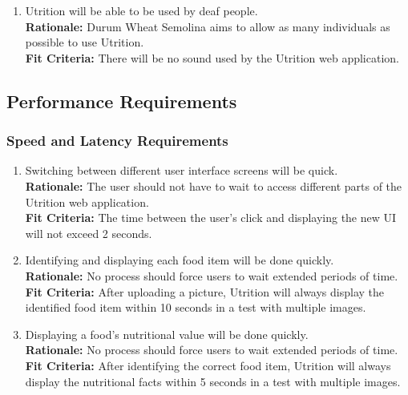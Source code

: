 \documentclass[12pt]{article}
\begin{document}
\begin{enumerate}[{UH}6. ] 
	\item Utrition will be able to be used by deaf people.\\
	\textbf{Rationale:} Durum Wheat Semolina aims to allow as many individuals as possible to use Utrition.\\
	\textbf{Fit Criteria:} There will be no sound used by the Utrition web application. 
\end{enumerate}

\subsection{Performance Requirements}

\subsubsection{Speed and Latency Requirements}

\begin{enumerate}[start=1,label={PR\arabic*.}]
	\item Switching between different user interface screens will be quick.\\
	\textbf{Rationale:} The user should not have to wait to access different parts of the Utrition web application.\\
	\textbf{Fit Criteria:} The time between the user’s click and displaying the new UI will not exceed 2 seconds.
	\item Identifying and displaying each food item will be done quickly.\\
	\textbf{Rationale:} No process should force users to wait extended periods of time.\\
	\textbf{Fit Criteria:} After uploading a picture, Utrition will always display the identified food item within 10 seconds in a test with multiple images.
	\item Displaying a food’s nutritional value will be done quickly. \\
	\textbf{Rationale:} No process should force users to wait extended periods of time. \\
	\textbf{Fit Criteria:} After identifying the correct food item, Utrition will always display the nutritional facts within 5 seconds in a test with multiple images.
\end{enumerate}
\end{document}
